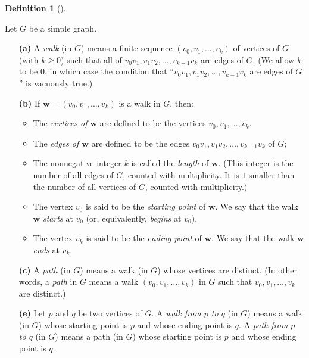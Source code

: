 \documentclass[numbers=enddot,12pt,final,onecolumn,notitlepage]{scrartcl}%
\theoremstyle{definition}
\newtheorem{defi}[theo]{Definition}
\newenvironment{definition}[1][]
{\begin{defi}[#1]\begin{leftbar}}
{\end{leftbar}\end{defi}}
\newcommand{\tup}[1]{\left( #1 \right)}
\begin{document}
\begin{definition} \label{def.intro.walks}
Let $G$ be a simple graph.

\begin{enumerate}

\item[\textbf{(a)}] A \textit{walk} (in $G$) means a finite
sequence $\tup{v_0, v_1, \ldots, v_k}$ of vertices of $G$
(with $k \geq 0$) such that all of
$v_0 v_1, v_1 v_2, \ldots, v_{k-1} v_k$ are edges of $G$. (We allow
$k$ to be $0$, in which case the condition that
``$v_0 v_1, v_1 v_2, \ldots, v_{k-1} v_k$ are edges of $G$'' is
vacuously true.)

\item[\textbf{(b)}] If $\mathbf{w} = \tup{v_0, v_1, \ldots, v_k}$
is a walk in $G$, then:

\begin{itemize}
\item The \textit{vertices of $\mathbf{w}$} are defined to be
the vertices $v_0, v_1, \ldots, v_k$.
\item The
\textit{edges of $\mathbf{w}$} are defined to be the edges
$v_0 v_1, v_1 v_2, \ldots, v_{k-1} v_k$ of $G$;
\item The nonnegative integer $k$ is called the
\textit{length} of $\mathbf{w}$. (This integer is the number of all
edges of $G$, counted with multiplicity. It is $1$ smaller than the
number of all vertices of $G$, counted with multiplicity.)
\item The vertex $v_0$ is said to be the \textit{starting point} of
$\mathbf{w}$. We say that the walk $\mathbf{w}$ \textit{starts} at
$v_0$ (or, equivalently, \textit{begins} at $v_0$).
\item The vertex $v_k$ is said to be the \textit{ending point} of
$\mathbf{w}$. We say that the walk $\mathbf{w}$ \textit{ends} at
$v_k$.
\end{itemize}

\item[\textbf{(c)}] A \textit{path} (in $G$) means a walk (in $G$)
whose vertices are distinct. (In other words, a \textit{path} in
$G$ means a walk $\tup{v_0, v_1, \ldots, v_k}$ in $G$ such that
$v_0, v_1, \ldots, v_k$ are distinct.)

\item[\textbf{(e)}] Let $p$ and $q$ be two vertices of $G$. A
\textit{walk from $p$ to $q$} (in $G$) means a walk (in $G$) whose
starting point is $p$ and whose ending point is $q$. A
\textit{path from $p$ to $q$} (in $G$) means a path (in $G$) whose
starting point is $p$ and whose ending point is $q$.

\end{enumerate}

\end{definition}
\end{document}
